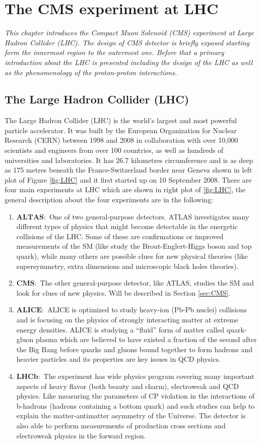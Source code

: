 \chapter{The CMS experiment at LHC}\label{chap:LHC_CMS}
\textit{This chapter introduces the Compact Muon Solenoid (CMS) experiment at Large Hadron Collider (LHC). The design of CMS detector is briefly exposed starting form the innermost region to the outermost one. Before that a primary introduction about the LHC is presented including the design of the LHC as well as the phenomenology of the proton-proton interactions.}
\section{The Large Hadron Collider (LHC)}\label{sec:LHC}
The Large Hadron Collider (LHC) is the world's largest and most powerful particle accelerator. It was built by the European Organization for Nuclear Research (CERN) between 1998 and 2008 in collaboration with over 10,000 scientists and engineers from over 100 countries, as well as hundreds of universities and laboratories. It has 26.7 kilometres circumference and is as deep as 175 metres beneath the France-Switzerland border near Geneva shown in left plot of Figure \ref{fig:LHC} and it first started up on 10 September 2008. There are four main experiments at LHC which are shown in right plot of \ref{fig:LHC}, the general description about the four experiments are in the following:
\begin{enumerate}
\item $\mathbf{ALTAS:}$ One of two general-purpose detectors. ATLAS investigates many different types of physics that might become detectable in the energetic collisions of the LHC. Some of these are confirmations or improved measurements of the SM (like study the Brout-Englert-Higgs boson and top quark), while many others are possible clues for new physical theories (like supersymmetry, extra dimensions and microscopic black holes theories).
\item $\mathbf{CMS:}$ The other general-purpose detector, like ATLAS, studies the SM and look for clues of new physics. Will be described in Section \ref{sec:CMS}.
\item $\mathbf{ALICE:}$ ALICE is optimized to study heavy-ion (Pb-Pb nuclei) collisions and is focusing on the physics of strongly interacting matter at extreme energy densities.
ALICE is studying a ``fluid'' form of matter called quark-gluon plasma which are believed to have existed a fraction of the second after the Big Bang before quarks and gluons bound together to form hadrons and heavier particles and its properties are key issues in QCD physics.
\item $\mathbf{LHCb:}$ The experiment has wide physics program covering many important aspects of heavy flavor (both beauty and charm), electroweak and QCD physics. Like measuring the parameters of CP violation in the interactions of b-hadrons (hadrons containing a bottom quark) and such studies can help to explain the matter-antimatter asymmetry of the Universe. The detector is also able to perform measurements of production cross sections and electroweak physics in the forward region.
\end{enumerate}

